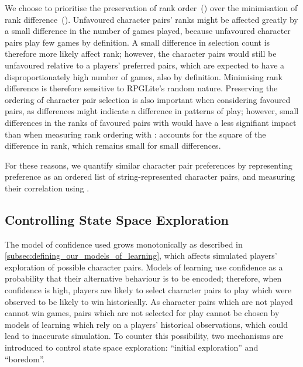 We choose to prioritise the preservation of rank order~(\tau{}) over the
minimisation of rank difference~(\rho{}). Unfavoured character pairs' ranks
might be affected greatly by a small difference in the number of games played,
because unfavoured character pairs play few games by definition. A small
difference in selection count is therefore more likely affect rank; however, the
character pairs would still be unfavoured relative to a players' preferred
pairs, which are expected to have a disproportionately high number of games,
also by definition. Minimising rank difference is therefore sensitive to
RPGLite's random nature. Preserving the ordering of character pair selection is
also important when considering favoured pairs, as differences might indicate a
difference in patterns of play; however, small differences in the ranks of
favoured pairs with \rho{} would have a less signifiant impact than when
measuring rank ordering with \tau{}: \rho{} accounts for the square of the
difference in rank, which remains small for small differences.

For these reasons, we quantify similar character pair preferences by
representing preference as an ordered list of string-represented character
pairs, and measuring their correlation using \tau{}.



\subsection{Controlling State Space Exploration}
\label{subsec:controlling_state_space_exploration}

The model of confidence used grows monotonically as described in
\cref{subsec:defining_our_models_of_learning}, which affects simulated players'
exploration of possible character pairs. Models of learning use confidence as a
probability that their alternative behaviour is to be encoded; therefore, when
confidence is high, players are likely to select character pairs to play which
were observed to be likely to win historically. As character pairs which are not
played cannot win games, pairs which are not selected for play cannot be chosen
by models of learning which rely on a players' historical observations, which
could lead to inaccurate simulation. To counter this possibility, two mechanisms
are introduced to control state space exploration: ``initial exploration'' and
``boredom''.

